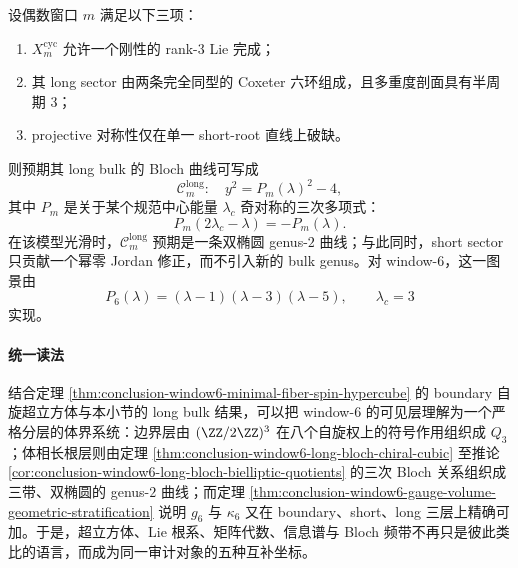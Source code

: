 \begin{conjecture}\label{conj:conclusion-even-window-long-bulk-bielliptic-universality}
设偶数窗口 \(m\) 满足以下三项：
\begin{enumerate}
  \item \(X_m^{\mathrm{cyc}}\) 允许一个刚性的 rank-\(3\) Lie 完成；
  \item 其 long sector 由两条完全同型的 Coxeter 六环组成，且多重度剖面具有半周期 \(3\)；
  \item projective 对称性仅在单一 short-root 直线上破缺。
\end{enumerate}
则预期其 long bulk 的 Bloch 曲线可写成
\[
\mathcal C_m^{\mathrm{long}}:\quad y^2=P_m(\lambda)^2-4,
\]
其中 \(P_m\) 是关于某个规范中心能量 \(\lambda_c\) 奇对称的三次多项式：
\[
P_m(2\lambda_c-\lambda)=-P_m(\lambda).
\]
在该模型光滑时，\(\mathcal C_m^{\mathrm{long}}\) 预期是一条双椭圆 genus-\(2\) 曲线；与此同时，short sector 只贡献一个幂零 Jordan 修正，而不引入新的 bulk genus。对 window-\(6\)，这一图景由
\[
P_6(\lambda)=(\lambda-1)(\lambda-3)(\lambda-5),
\qquad
\lambda_c=3
\]
实现。
\end{conjecture}

\paragraph{统一读法}
结合定理 \ref{thm:conclusion-window6-minimal-fiber-spin-hypercube} 的 boundary 自旋超立方体与本小节的 long bulk 结果，可以把 window-\(6\) 的可见层理解为一个严格分层的体界系统：边界层由 \((\ZZ/2\ZZ)^3\) 在八个自旋权上的符号作用组织成 \(Q_3\)；体相长根层则由定理 \ref{thm:conclusion-window6-long-bloch-chiral-cubic} 至推论 \ref{cor:conclusion-window6-long-bloch-bielliptic-quotients} 的三次 Bloch 关系组织成三带、双椭圆的 genus-\(2\) 曲线；而定理 \ref{thm:conclusion-window6-gauge-volume-geometric-stratification} 说明 \(g_6\) 与 \(\kappa_6\) 又在 boundary、short、long 三层上精确可加。于是，超立方体、Lie 根系、矩阵代数、信息谱与 Bloch 频带不再只是彼此类比的语言，而成为同一审计对象的五种互补坐标。

\endinput
